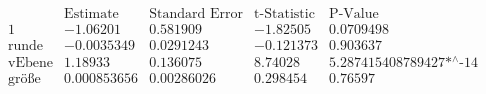 \[\begin{array}{l|llll}
 \text{} & \text{Estimate} & \text{Standard Error} & \text{t-Statistic} & \text{P-Value} \\
\hline
 1 & -1.06201 & 0.581909 & -1.82505 & 0.0709498 \\
 \text{runde} & -0.0035349 & 0.0291243 & -0.121373 & 0.903637 \\
 \text{vEbene} & 1.18933 & 0.136075 & 8.74028 & \text{5.287415408789427$\grave{ }$*${}^{\wedge}$-14} \\
 \text{gr{\" o}{\ss}e} & 0.000853656 & 0.00286026 & 0.298454 & 0.76597 \\
\end{array}\]

